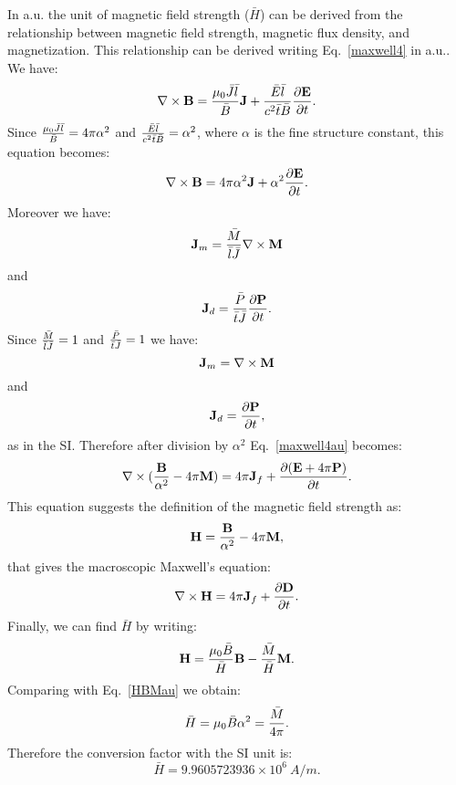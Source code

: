 \documentclass[12pt,a4paper]{article}
\def\barh{9.9605723936\times 10^{6}}
\begin{document}
{\color{web-blue} In a.u. the unit of magnetic field strength ($\bar H$) 
can be derived from the relationship between magnetic field strength,
magnetic flux density, and magnetization. This relationship can
be derived writing Eq.~\ref{maxwell4} in a.u..
We have:
\begin{equation}
\nabla \times {\bf B}= {\mu_0 \bar J \bar l \over \bar B} {\bf J} + 
{\bar E \bar l \over c^2 \bar t \bar B} {\partial {\bf E} \over
\partial t}.
\label{maxwell4gen}
\end{equation}
Since ${\mu_0 \bar J \bar l \over \bar B}=4 \pi \alpha^2$ and 
${\bar E \bar l \over c^2 \bar t \bar B}=\alpha^2$, where $\alpha$ 
is the fine structure constant, this equation becomes:
\begin{equation}
\nabla \times {\bf B}= {4 \pi \alpha^2} {\bf J} + {\alpha^2} 
{\partial {\bf E} \over \partial t}.
\label{maxwell4au}
\end{equation}
Moreover we have:
\begin{equation}
{\bf J}_m={\bar M \over \bar l \bar J} \nabla \times {\bf M}
\end{equation}
and 
\begin{equation}
{\bf J}_d={\bar P \over \bar t \bar J} {\partial {\bf P} \over \partial t}.
\end{equation}
Since ${\bar M \over \bar l \bar J}=1$ and 
${\bar P \over \bar t \bar J}=1$ we have:
\begin{equation}
{\bf J}_m= \nabla \times {\bf M}
\end{equation}
and 
\begin{equation}
{\bf J}_d={\partial {\bf P} \over \partial t},
\end{equation}
as in the SI. Therefore after division by $\alpha^2$ 
Eq.~\ref{maxwell4au} becomes:
\begin{equation}
\nabla \times ({{\bf B}\over \alpha^2} -4\pi {\bf M})= 
{4 \pi} {\bf J}_f +  {\partial ({\bf E}+4\pi {\bf P}) \over \partial t}.
\label{maxwell4au1}
\end{equation}
This equation suggests the definition of the magnetic field strength as:
\begin{equation}
{\bf H}={{\bf B}\over \alpha^2} -4\pi {\bf M},
\label{HBMau}
\end{equation}
that gives the macroscopic Maxwell's equation:
\begin{equation}
\nabla \times {\bf H}= 
{4 \pi} {\bf J}_f +  {\partial {\bf D} \over \partial t}.
\end{equation}
Finally, we can find $\bar H$ by writing:
\begin{equation}
{\bf H} = {\mu_0 \bar B \over \bar H} {\bf B} - {\bar M \over \bar H} {\bf M}.
\label{HBMgen}
\end{equation}
Comparing with Eq.~\ref{HBMau} we obtain:
\begin{equation}
\bar H={\mu_0 \bar B \alpha^2} = {\bar M \over 4 \pi}.
\end{equation}
Therefore the conversion factor with the SI unit is:
\begin{equation}
\bar H = \barh\ A/m.
\end{equation}
}
\\
\end{document}
